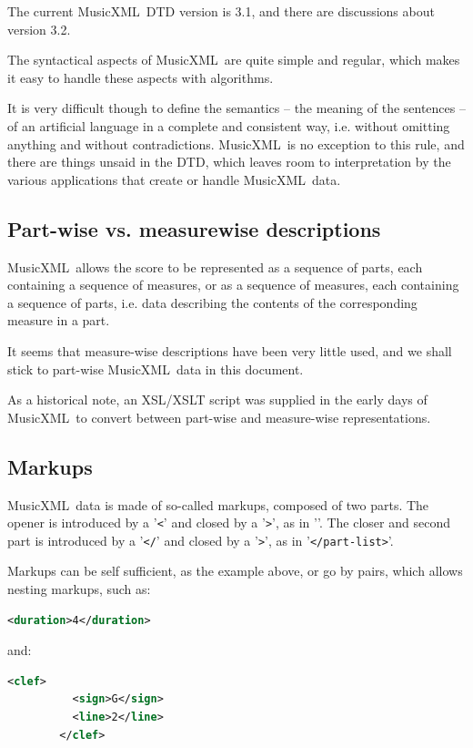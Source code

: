 \documentclass[12pt,a4paper]{article}
\newcommand{\mxml}{MusicXML}
\begin{document}
The current \mxml\ DTD version is 3.1, and there are discussions about version 3.2.

The syntactical aspects of \mxml\ are quite simple and regular, which makes it easy to handle these aspects with algorithms.

It is very difficult though to define the semantics -- the meaning of the sentences -- of an artificial language in a complete and consistent way, i.e. without omitting anything and without contradictions. \mxml\ is no exception to this rule, and there are things unsaid in the DTD, which leaves room to interpretation by the various applications that create or handle \mxml\ data.

\subsection{Part-wise vs. measurewise descriptions}

\mxml\ allows the score to be represented as a sequence of parts, each containing a sequence of measures, or as a sequence of measures, each containing a sequence of parts, i.e. data describing the contents of the corresponding measure in a part.
 
It seems that measure-wise descriptions have been very little used, and we shall stick to part-wise \mxml\ data in this document.

As a historical note, an XSL/XSLT script was supplied in the early days of \mxml\ to convert between part-wise and measure-wise representations.

\subsection{Markups}

\mxml\ data is made of so-called markups, composed of two parts. The opener is introduced by a '{\tt <}' and closed by a '{\tt >}', as in '{\tt <part-list>}'. The closer and second part is introduced by a '{\tt </}' and closed by a '{\tt >}', as in '{\tt </part-list>}'.

Markups can be self sufficient, as the example above, or go by pairs, which allows nesting markups, such as:
\begin{lstlisting}[language=XML]
        <duration>4</duration>
\end{lstlisting}
and:
\begin{lstlisting}[language=XML]
        <clef>
          <sign>G</sign>
          <line>2</line>
        </clef>
\end{lstlisting}
\end{document}
